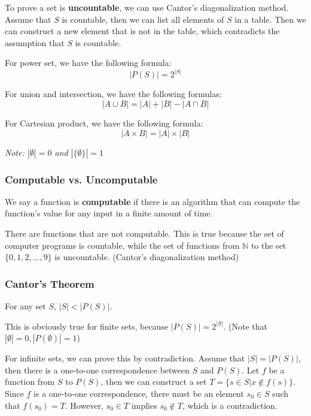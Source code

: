 \documentclass[a4paper,12pt]{article}
\begin{document}
To prove a set is \textbf{uncountable}, we can use Cantor's diagonalization method.
Assume that $S$ is countable, then we can list all elements of $S$ in a table.
Then we can construct a new element that is not in the table, which contradicts the assumption that $S$ is countable.

For power set, we have the following formula:
\begin{equation*}
	|P(S)| = 2^{|S|}
\end{equation*}

For union and intersection, we have the following formulas:
\begin{equation*}
	|A \cup B| = |A| + |B| - |A \cap B|
\end{equation*}

For Cartesian product, we have the following formula:
\begin{equation*}
	|A \times B| = |A| \times |B|
\end{equation*}

\textit{Note: $|\emptyset| = 0$ and $|\{\emptyset\}| = 1$}

\subsubsection{Computable vs. Uncomputable}

We say a function is \textbf{computable} if there is an algorithm that can compute the function's value for any input in a finite amount of time.

There are functions that are not computable.
This is true because the set of computer programs is countable, while the set of functions from $\mathbb{N}$ to the set $\{0,1,2,...,9\}$ is uncountable. (Cantor's diagonalization method)

\subsubsection{Cantor's Theorem}

For any set $S$, $|S| < |P(S)|$.

This is obviously true for finite sets, because $|P(S)| = 2^{|S|}$. 
(Note that $|\emptyset| = 0, |P(\emptyset)| = 1$)

For infinite sets, we can prove this by contradiction.
Assume that $|S| = |P(S)|$, then there is a one-to-one correspondence between $S$ and $P(S)$.
Let $f$ be a function from $S$ to $P(S)$, then we can construct a set $T = \{s \in S | x \notin f(s)\}$.
Since $f$ is a one-to-one correspondence, there must be an element $s_0 \in S$ such that $f(s_0) = T$.
However, $s_0 \in T$ implies $s_0 \notin T$, which is a contradiction.
\end{document}
